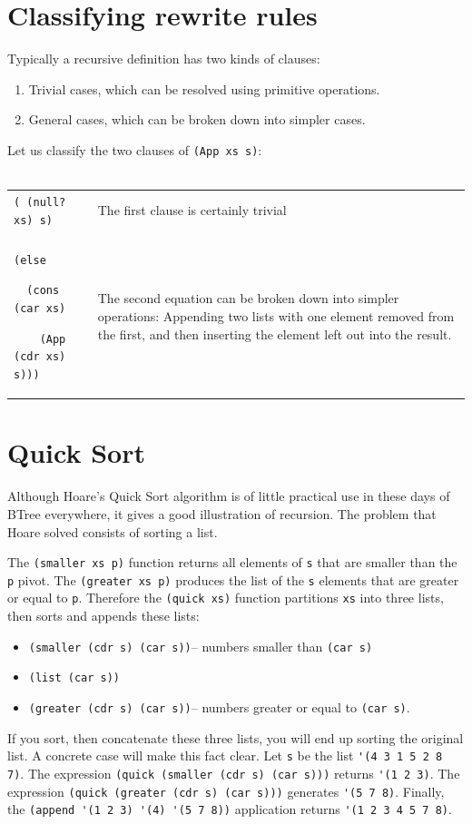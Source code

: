 \documentclass[a4paper,12pt]{book}
\begin{document}
\section{Classifying rewrite rules}
Typically a recursive definition has two kinds of clauses:
\begin{enumerate}
\item Trivial cases, which can be  
resolved using primitive operations.
\item General cases, which can be  
broken down into simpler cases.
\end{enumerate}
Let us classify the two clauses of \verb|(App xs s)|:\\

\verb||\\
\begin{tabular}{p{5cm}p{7cm}}
\verb|( (null? xs) s)| & The first clause is certainly trivial\\
\\
\verb|(else |

\verb|  (cons (car xs)|

\verb|    (App (cdr xs) s)))|
& The second equation can be
broken down into simpler
operations: Appending two
lists with one element
removed from the first,
and then inserting the element
left out into the result.\\
\end{tabular}


\section{Quick Sort}
Although Hoare's Quick Sort algorithm is
of little practical use in these days of BTree everywhere, it gives a good illustration
of recursion. The problem that Hoare solved consists of sorting a list.

The \verb|(smaller xs p)| function returns
all elements of \verb|s| that are smaller
than the \verb|p| pivot. 
The \verb|(greater xs p)| produces the
list of the \verb|s| elements that are
greater or equal to \verb|p|. Therefore the
\verb|(quick xs)| function partitions 
\verb|xs| into three lists, then sorts
and appends these lists:
\begin{itemize}
\item \verb|(smaller (cdr s) (car s))|--
 numbers smaller than \verb|(car s)|
\item \verb|(list (car s))| 
\item \verb|(greater (cdr s) (car s))|--
 numbers greater or equal to \verb|(car s)|.
\end{itemize}
If you sort, then concatenate these three lists,
you will end up sorting the original list.
A concrete case will make this fact clear.
Let \verb|s| be the list \verb|'(4 3 1 5 2 8 7)|.
The expression
 \verb|(quick (smaller (cdr s) (car s)))|
returns \verb|'(1 2 3)|.
The expression
 \verb|(quick (greater (cdr s) (car s)))|
generates \verb|'(5 7 8)|. Finally, 
the 
\verb|(append '(1 2 3) '(4) '(5 7 8))|
application
returns \verb|'(1 2 3 4 5 7 8)|.
\end{document}
